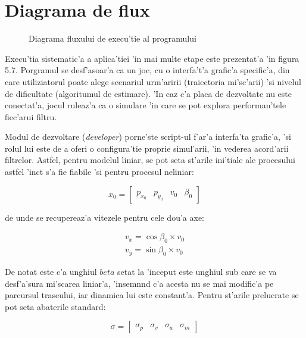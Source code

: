 \documentclass[12pt,a4paper,twoside]{report}
\begin{document}
\section{Diagrama de flux}

\begin{figure}[H]
\centering
 
 \caption{Diagrama fluxului de execu'tie al programului}
\end{figure}

Execu'tia sistematic'a a aplica'tiei 'in mai multe etape este prezentat'a 'in figura 5.7. Porgramul se desf'asoar'a ca un joc, cu o interfa't'a grafic'a specific'a, din care utiliziatorul poate alege scenariul urm'aririi (traiectoria mi'sc'arii) 'si nivelul de dificultate (algoritumul de estimare). 'In caz c'a placa de dezvoltate nu este conectat'a, jocul ruleaz'a ca o simulare 'in care se pot explora performan'tele fiec'arui filtru.

\vspace{5px}

Modul de dezvoltare (\textit{developer}) porne'ste script-ul f'ar'a interfa'ta grafic'a, 'si rolul lui este de a oferi o configura'tie proprie simul'arii, 'in vederea acord'arii filtrelor. Astfel, pentru modelul liniar, se pot seta st'arile ini'tiale ale procesului astfel 'inc\ia t s'a fie fiabile 'si pentru procesul neliniar:

\begin{equation}
    x_0 = \begin{bmatrix}
    p_{x_0} & p_{y_0} & v_{0} & \beta_{0} 
    \end{bmatrix}
\end{equation}

de unde se recupereaz'a vitezele pentru cele dou'a axe:

\begin{gather}
    v_x = \cos{\beta_0} \times v_0 \\
    v_y = \sin{\beta_0} \times v_0
\end{gather}

De notat este c'a unghiul $beta$ setat la 'inceput este unghiul sub care se va desf'a'sura mi'scarea liniar'a, 'insemn\ia nd c'a acesta nu se mai modific'a pe parcursul traseului, iar dinamica lui este constant'a. Pentru st'arile prelucrate se pot seta abaterile standard:

\begin{equation}
    \sigma = \begin{bmatrix}
    \sigma_{p} & \sigma_{v} & \sigma_{a} & \sigma_{m}
    \end{bmatrix}
\end{equation}
\end{document}
